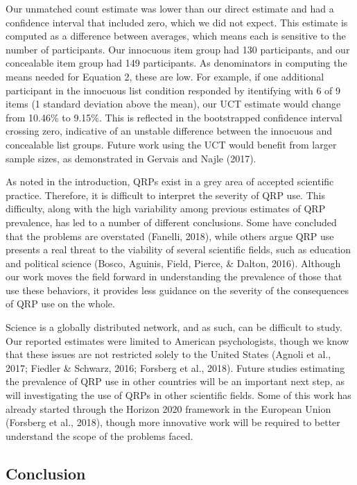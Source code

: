 \documentclass[jou]{apa6}
\theoremstyle{definition}
\theoremstyle{definition}
\theoremstyle{definition}
\theoremstyle{remark}
\begin{document}
Our unmatched count estimate was lower than our direct estimate and had
a confidence interval that included zero, which we did not expect. This
estimate is computed as a difference between averages, which means each
is sensitive to the number of participants. Our innocuous item group had
130 participants, and our concealable item group had 149 participants.
As denominators in computing the means needed for Equation 2, these are
low. For example, if one additional participant in the innocuous list
condition responded by itentifying with 6 of 9 items (1 standard
deviation above the mean), our UCT estimate would change from 10.46\% to
9.15\%. This is reflected in the bootstrapped confidence interval
crossing zero, indicative of an unstable difference between the
innocuous and concealable list groups. Future work using the UCT would
benefit from larger sample sizes, as demonstrated in Gervais and Najle
(2017).

As noted in the introduction, QRPs exist in a grey area of accepted
scientific practice. Therefore, it is difficult to interpret the
severity of QRP use. This difficulty, along with the high variability
among previous estimates of QRP prevalence, has led to a number of
different conclusions. Some have concluded that the problems are
overstated (Fanelli, 2018), while others argue QRP use presents a real
threat to the viability of several scientific fields, such as education
and political science (Bosco, Aguinis, Field, Pierce, \& Dalton, 2016).
Although our work moves the field forward in understanding the
prevalence of those that use these behaviors, it provides less guidance
on the severity of the consequences of QRP use on the whole.

Science is a globally distributed network, and as such, can be difficult
to study. Our reported estimates were limited to American psychologists,
though we know that these issues are not restricted solely to the United
States (Agnoli et al., 2017; Fiedler \& Schwarz, 2016; Forsberg et al.,
2018). Future studies estimating the prevalence of QRP use in other
countries will be an important next step, as will investigating the use
of QRPs in other scientific fields. Some of this work has already
started through the Horizon 2020 framework in the European Union
(Forsberg et al., 2018), though more innovative work will be required to
better understand the scope of the problems faced.

\subsection{Conclusion}\label{conclusion}
\end{document}
